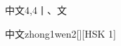 \begin{entry}{中文}{4,4}{⼁、⽂}
  \begin{phonetics}{中文}{zhong1wen2}[][HSK 1]
  \end{phonetics}
\end{entry}
